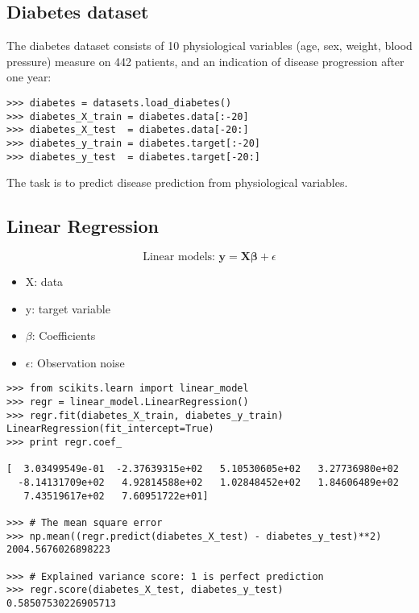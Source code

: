 \documentclass[SKL-MASTER.tex]{subfiles}
\begin{document}
	\Large


\subsection*{Diabetes dataset}

The diabetes dataset consists of 10 physiological variables (age, sex, weight, blood pressure) measure on 442 patients, and an indication of disease progression after one year:

\begin{framed}
\begin{verbatim}
>>> diabetes = datasets.load_diabetes()
>>> diabetes_X_train = diabetes.data[:-20]
>>> diabetes_X_test  = diabetes.data[-20:]
>>> diabetes_y_train = diabetes.target[:-20]
>>> diabetes_y_test  = diabetes.target[-20:]
\end{verbatim}
\end{framed}
The task  is to predict disease prediction from physiological variables.

\subsection*{ Linear Regression }
\[ \mbox{Linear models:   } \mathbf{y} = \mathbf{X\beta} + \epsilon \]

\begin{itemize}
\item X: data
\item y: target variable
\item $\beta$: Coefficients
\item $\epsilon$: Observation noise
\end{itemize}

\begin{framed}
\begin{verbatim}
>>> from scikits.learn import linear_model
>>> regr = linear_model.LinearRegression()
>>> regr.fit(diabetes_X_train, diabetes_y_train)
LinearRegression(fit_intercept=True)
>>> print regr.coef_

[  3.03499549e-01  -2.37639315e+02   5.10530605e+02   3.27736980e+02
  -8.14131709e+02   4.92814588e+02   1.02848452e+02   1.84606489e+02
   7.43519617e+02   7.60951722e+01]

>>> # The mean square error
>>> np.mean((regr.predict(diabetes_X_test) - diabetes_y_test)**2)
2004.5676026898223

>>> # Explained variance score: 1 is perfect prediction
>>> regr.score(diabetes_X_test, diabetes_y_test)
0.58507530226905713
\end{verbatim}
\end{framed}
\end{document}
